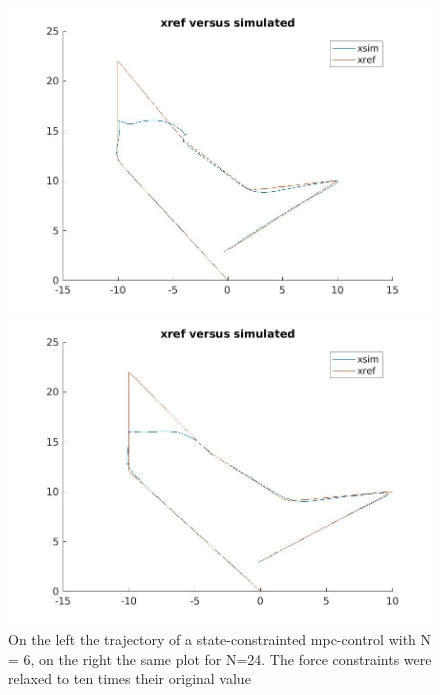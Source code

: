 \documentclass[•]{article}
\begin{document}
\begin{figure}[H]
\begin{minipage}{.45\textwidth}
\includegraphics[width = \textwidth]{mpctrajforce6.jpg}
\end{minipage}
\begin{minipage}{.45\textwidth}
\includegraphics[width = \textwidth]{mpctrajforce24.jpg}
\end{minipage}
\caption{On the left the trajectory of a state-constrainted mpc-control with N = 6, on the right the same plot for N=24. The force constraints were relaxed to ten times their original value}
\end{figure}
\end{document}
